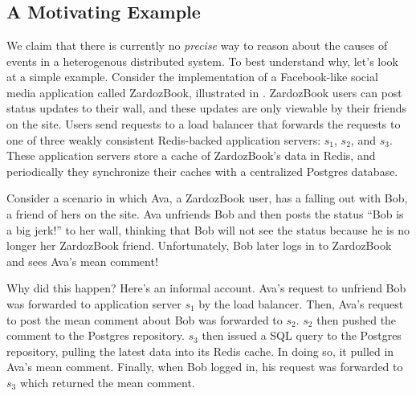 \section{\WatProvenance{}}

\subsection{A Motivating Example}
\newcommand{\systemname}{ZardozBook}
We claim that there is currently no \emph{precise} way to reason about the
causes of events in a heterogenous distributed system. To best understand why,
let's look at a simple example.  Consider the implementation of a Facebook-like
social media application called \systemname{}, illustrated in
. \systemname{} users can post status updates to their
wall, and these updates are only viewable by their friends on the site. Users
send requests to a load balancer that forwards the requests to one of three
weakly consistent Redis-backed application servers: $s_1$, $s_2$, and $s_3$.
These application servers store a cache of \systemname{}'s data in Redis, and
periodically they synchronize their caches with a centralized Postgres
database.

Consider a scenario in which Ava, a \systemname{} user, has a falling out with
Bob, a friend of hers on the site. Ava unfriends Bob and then posts the status
``Bob is a big jerk!'' to her wall, thinking that Bob will not see the status
because he is no longer her \systemname{} friend. Unfortunately, Bob later logs
in to \systemname{} and sees Ava's mean comment!

{}

Why did this happen? Here's an informal account. Ava's request to unfriend Bob
was forwarded to application server $s_1$ by the load balancer.  Then, Ava's
request to post the mean comment about Bob was forwarded to $s_2$.  $s_2$ then
pushed the comment to the Postgres repository.  $s_3$ then issued a SQL query
to the Postgres repository, pulling the latest data into its Redis cache. In
doing so, it pulled in Ava's mean comment.  Finally, when Bob logged in, his
request was forwarded to $s_3$ which returned the mean comment.

